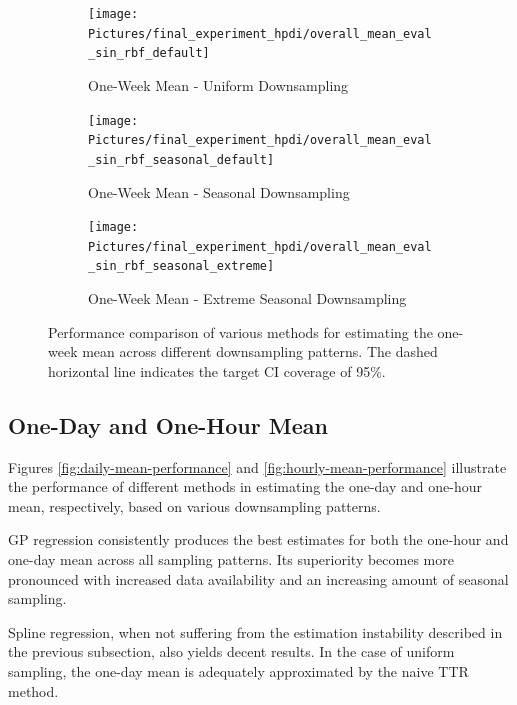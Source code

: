 \begin{figure}[!htb]
\centering
\begin{subfigure}{\textwidth}
    \centering
    \texttt{[image: Pictures/final\_experiment\_hpdi/overall\_mean\_eval\_sin\_rbf\_default]}
    \caption{One-Week Mean - Uniform Downsampling}
    \label{fig:weekly-mean-uniform-sampling-performance}
\end{subfigure}

\bigskip

\begin{subfigure}{\textwidth}
    \centering
    \texttt{[image: Pictures/final\_experiment\_hpdi/overall\_mean\_eval\_sin\_rbf\_seasonal\_default]}
    \caption{One-Week Mean - Seasonal Downsampling}
    \label{fig:weekly-mean-seasonal-sampling-performance}
\end{subfigure}

\bigskip

\begin{subfigure}{\textwidth}
    \centering
    \texttt{[image: Pictures/final\_experiment\_hpdi/overall\_mean\_eval\_sin\_rbf\_seasonal\_extreme]}
    \caption{One-Week Mean - Extreme Seasonal Downsampling}
    \label{fig:weekly-mean-extreme-seasonal-sampling-performance}
\end{subfigure}

\caption[One-Week Mean Performance]{
    Performance comparison of various methods for
estimating the one-week mean across different downsampling patterns.
    The dashed horizontal line indicates the target CI coverage of 95\%.
}
\label{fig:weekly-mean-performance}
\end{figure}



\subsection{One-Day and One-Hour Mean}

Figures \ref{fig:daily-mean-performance} and \ref{fig:hourly-mean-performance}
illustrate the performance of different methods in estimating the one-day and one-hour mean,
respectively, based on various downsampling patterns.

GP regression consistently produces the best estimates for both the one-hour and
one-day mean across all sampling patterns.
Its superiority becomes more pronounced with increased data availability and
an increasing amount of seasonal sampling.

Spline regression, when not suffering from the estimation instability
described in the previous subsection, also yields decent results.
In the case of uniform sampling, the one-day mean is adequately approximated
by the naive TTR method.


